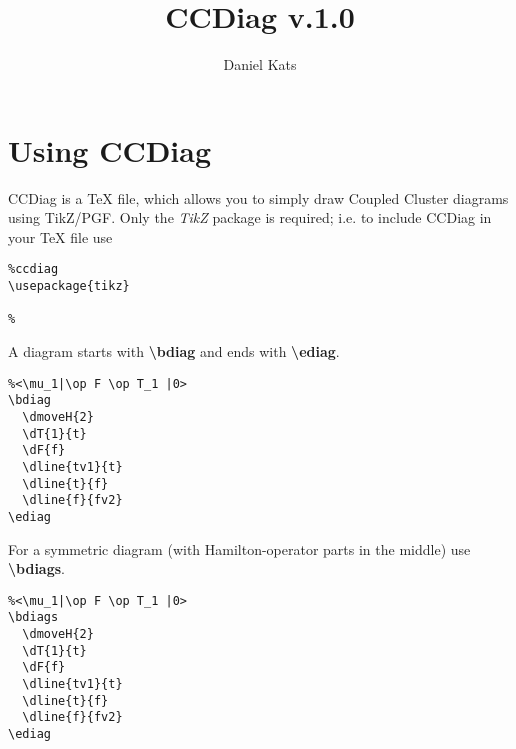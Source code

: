 \documentclass[a4paper]{article}
\begin{document}
\author{Daniel Kats}
\title{CCDiag v.1.0}
\maketitle

\tableofcontents

\section{Using CCDiag}

CCDiag is a TeX file, which allows you to simply draw Coupled Cluster diagrams using TikZ/PGF.
Only the {\it TikZ} package is required; i.e. to include CCDiag in your TeX file use
\begin{lstlisting}
%ccdiag
\usepackage{tikz}

%  
\end{lstlisting}

A diagram starts with {\bf \textbackslash bdiag} and ends with {\bf \textbackslash ediag}.

 \begin{minipage}[b]{0.5\linewidth}\centering
  \begin{lstlisting}
%<\mu_1|\op F \op T_1 |0>
\bdiag
  \dmoveH{2}
  \dT{1}{t}
  \dF{f}
  \dline{tv1}{t}
  \dline{t}{f}
  \dline{f}{fv2}
\ediag 
  \end{lstlisting}
 \end{minipage}
 \begin{minipage}[b]{0.5\linewidth}\centering
    \bdiag
    \ediag
 \end{minipage}

For a symmetric diagram (with Hamilton-operator parts in the middle) use {\bf \textbackslash bdiags}.

 \begin{minipage}[b]{0.5\linewidth}\centering
  \begin{lstlisting}
%<\mu_1|\op F \op T_1 |0>
\bdiags
  \dmoveH{2}
  \dT{1}{t}
  \dF{f}
  \dline{tv1}{t}
  \dline{t}{f}
  \dline{f}{fv2}
\ediag 
  \end{lstlisting}
 \end{minipage}
 \begin{minipage}[b]{0.5\linewidth}\centering
    \bdiags
    \ediag
 \end{minipage}
\end{document}
